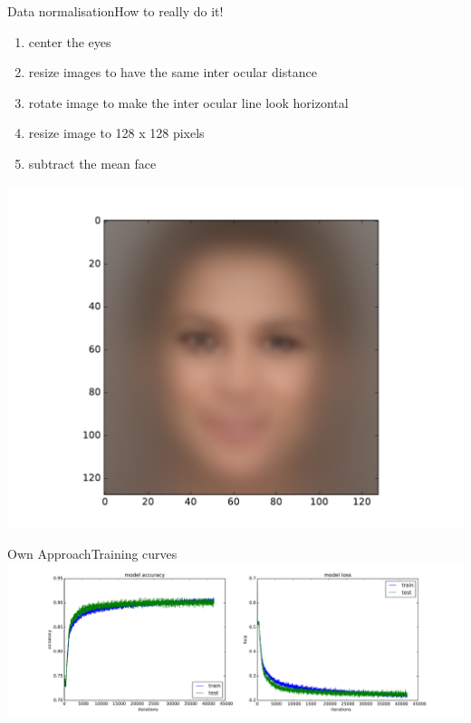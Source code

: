 \documentclass{beamer}
\begin{document}
\begin{frame}{Data normalisation}{How to really do it!}
\begin{enumerate}
\item center the eyes
\item resize images to have the same inter ocular distance
\item rotate image to make the inter ocular line look horizontal
\item resize image to 128 x 128 pixels
\item subtract the mean face
\end{enumerate}
\centering
	\includegraphics[height=0.6\textheight]{figures/meanFace} 
\end{frame}

\begin{frame}{Own Approach}{Training curves}
\hspace*{-2.4cm}
	\includegraphics[height=0.6\textheight]{figures/lossGood} 
\end{frame}
\end{document}
